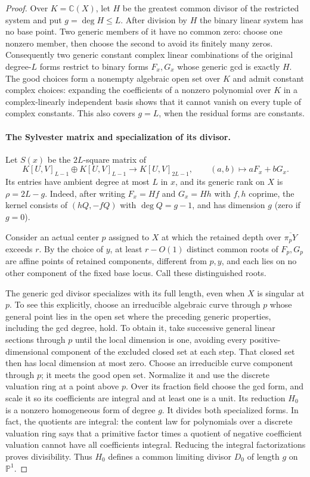 \begin{proof}
Over $K=\mathbb{C}(X)$, let $H$ be the greatest common divisor of the restricted system and put $g=\deg H\le L$. After division by $H$ the binary linear system has no base point. Two generic members of it have no common zero: choose one nonzero member, then choose the second to avoid its finitely many zeros. Consequently two generic constant complex linear combinations of the original degree-$L$ forms restrict to binary forms $F_x,G_x$ whose generic gcd is exactly $H$. The good choices form a nonempty algebraic open set over $K$ and admit constant complex choices: expanding the coefficients of a nonzero polynomial over $K$ in a complex-linearly independent basis shows that it cannot vanish on every tuple of complex constants. This also covers $g=L$, when the residual forms are constants.

\paragraph{The Sylvester matrix and specialization of its divisor.}
Let $S(x)$ be the $2L$-square matrix of
\[
 K[U,V]_{L-1}\oplus K[U,V]_{L-1}
 \longrightarrow K[U,V]_{2L-1},\qquad
 (a,b)\longmapsto aF_x+bG_x.
\]
Its entries have ambient degree at most $L$ in $x$, and its generic rank on $X$ is $\rho=2L-g$. Indeed, after writing $F_x=Hf$ and $G_x=Hh$ with $f,h$ coprime, the kernel consists of $(hQ,-fQ)$ with $\deg Q=g-1$, and has dimension $g$ (zero if $g=0$).

Consider an actual center $p$ assigned to $X$ at which the retained depth over $\overline{\pi_pY}$ exceeds $r$. By the choice of $y$, at least $r-O(1)$ distinct common roots of $F_p,G_p$ are affine points of retained components, different from $p,y$, and each lies on no other component of the fixed base locus. Call these distinguished roots.

The generic gcd divisor specializes with its full length, even when $X$ is singular at $p$. To see this explicitly, choose an irreducible algebraic curve through $p$ whose general point lies in the open set where the preceding generic properties, including the gcd degree, hold. To obtain it, take successive general linear sections through $p$ until the local dimension is one, avoiding every positive-dimensional component of the excluded closed set at each step. That closed set then has local dimension at most zero. Choose an irreducible curve component through $p$; it meets the good open set. Normalize it and use the discrete valuation ring at a point above $p$. Over its fraction field choose the gcd form, and scale it so its coefficients are integral and at least one is a unit. Its reduction $H_0$ is a nonzero homogeneous form of degree $g$. It divides both specialized forms. In fact, the quotients are integral: the content law for polynomials over a discrete valuation ring says that a primitive factor times a quotient of negative coefficient valuation cannot have all coefficients integral. Reducing the integral factorizations proves divisibility. Thus $H_0$ defines a common limiting divisor $D_0$ of length $g$ on $\mathbb{P}^1$.


\end{proof}
